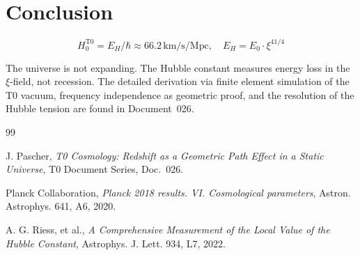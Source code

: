 \section{Conclusion}

	\begin{equation}
		\boxed{H_0^{\text{T0}} = E_H/\hbar \approx 66.2\,\text{km/s/Mpc}, \quad E_H = E_0 \cdot \xi^{41/4}}
	\end{equation}

	The universe is not expanding. The Hubble constant measures energy loss in the $\xi$-field, not recession. The detailed derivation via finite element simulation of the T0 vacuum, frequency independence as geometric proof, and the resolution of the Hubble tension are found in Document~026.

	\begin{thebibliography}{99}

		J. Pascher, \textit{T0 Cosmology: Redshift as a Geometric Path Effect in a Static Universe}, T0 Document Series, Doc.~026.

		Planck Collaboration, \textit{Planck 2018 results. VI. Cosmological parameters}, Astron. Astrophys. 641, A6, 2020.

		A. G. Riess, et al., \textit{A Comprehensive Measurement of the Local Value of the Hubble Constant}, Astrophys. J. Lett. 934, L7, 2022.

	\end{thebibliography}
